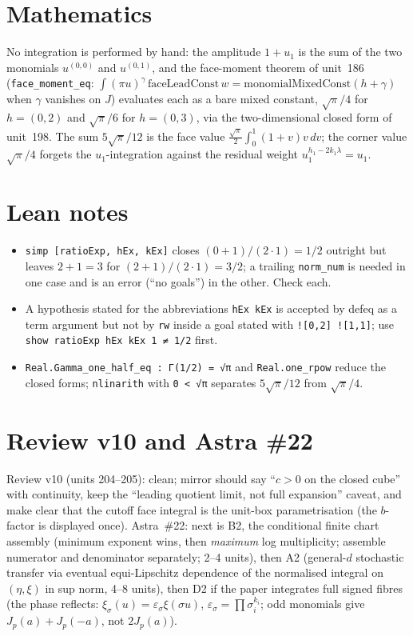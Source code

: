 \documentclass[11pt]{article}
\begin{document}
\section{Mathematics}
No integration is performed by hand: the amplitude $1+u_1$ is the sum of the two monomials
$u^{(0,0)}$ and $u^{(0,1)}$, and the face-moment theorem of unit~186
(\texttt{face\_moment\_eq}: $\int(\pi u)^\gamma\,\mathrm{faceLeadConst}\,w
=\mathrm{monomialMixedConst}(h+\gamma)$ when $\gamma$ vanishes on $J$) evaluates each as a bare
mixed constant, $\sqrt\pi/4$ for $h=(0,2)$ and $\sqrt\pi/6$ for $h=(0,3)$, via the two-dimensional
closed form of unit~198. The sum $5\sqrt\pi/12$ is the face value
$\tfrac{\sqrt\pi}2\int_0^1(1+v)v\,dv$; the corner value $\sqrt\pi/4$ forgets the $u_1$-integration
against the residual weight $u_1^{h_1-2k_1\lambda}=u_1$.

\section{Lean notes}
\begin{itemize}
\item \texttt{simp [ratioExp, hEx, kEx]} closes $(0+1)/(2\cdot1)=1/2$ outright but leaves
  $2+1=3$ for $(2+1)/(2\cdot1)=3/2$; a trailing \texttt{norm\_num} is needed in one case and is an
  error (``no goals'') in the other. Check each.
\item A hypothesis stated for the abbreviations \texttt{hEx kEx} is accepted by defeq as a term
  argument but not by \texttt{rw} inside a goal stated with \texttt{![0,2] ![1,1]}; use
  \texttt{show ratioExp hEx kEx 1 ≠ 1/2} first.
\item \texttt{Real.Gamma\_one\_half\_eq : Γ(1/2) = √π} and \texttt{Real.one\_rpow} reduce the
  closed forms; \texttt{nlinarith} with \texttt{0 < √π} separates $5\sqrt\pi/12$ from $\sqrt\pi/4$.
\end{itemize}

\section{Review v10 and Astra \#22}
Review v10 (units 204--205): clean; mirror should say ``$c>0$ on the closed cube'' with continuity,
keep the ``leading quotient limit, not full expansion'' caveat, and make clear that the cutoff face
integral is the unit-box parametrisation (the $b$-factor is displayed once). Astra~\#22: next is
B2, the conditional finite chart assembly (minimum exponent wins, then \emph{maximum} log
multiplicity; assemble numerator and denominator separately; 2--4 units), then A2 (general-$d$
stochastic transfer via eventual equi-Lipschitz dependence of the normalised integral on
$(\eta,\xi)$ in sup norm, 4--8 units), then D2 if the paper integrates full signed fibres (the phase
reflects: $\xi_\sigma(u)=\varepsilon_\sigma\xi(\sigma u)$, $\varepsilon_\sigma=\prod\sigma_i^{k_i}$;
odd monomials give $J_p(a)+J_p(-a)$, not $2J_p(a)$).
\end{document}
